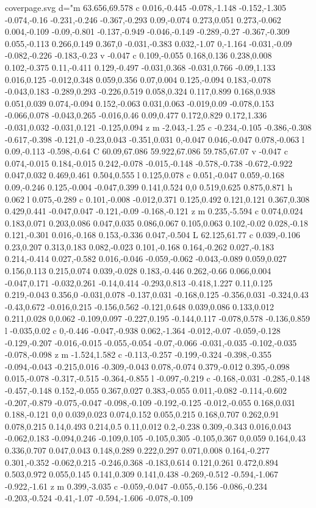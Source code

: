 \begin{filecontents}[noheader]{coverpage.svg}
					 d="m 63.656,69.578 c 0.016,-0.445 -0.078,-1.148 -0.152,-1.305 -0.074,-0.16 -0.231,-0.246 -0.367,-0.293 0.09,-0.074 0.273,0.051 0.273,-0.062 0.004,-0.109 -0.09,-0.801 -0.137,-0.949 -0.046,-0.149 -0.289,-0.27 -0.367,-0.309 0.055,-0.113 0.266,0.149 0.367,0 -0.031,-0.383 0.032,-1.07 0,-1.164 -0.031,-0.09 -0.082,-0.226 -0.183,-0.23 v -0.047 c 0.109,-0.055 0.168,0.136 0.238,0.008 0.102,-0.375 0.11,-0.411 0.129,-0.497 -0.031,0.368 -0.031,0.766 -0.09,1.133 0.016,0.125 -0.012,0.348 0.059,0.356 0.07,0.004 0.125,-0.094 0.183,-0.078 -0.043,0.183 -0.289,0.293 -0.226,0.519 0.058,0.324 0.117,0.899 0.168,0.938 0.051,0.039 0.074,-0.094 0.152,-0.063 0.031,0.063 -0.019,0.09 -0.078,0.153 -0.066,0.078 -0.043,0.265 -0.016,0.46 0.09,0.477 0.172,0.829 0.172,1.336 -0.031,0.032 -0.031,0.121 -0.125,0.094 z m -2.043,-1.25 c -0.234,-0.105 -0.386,-0.308 -0.617,-0.398 -0.121,0 -0.23,0.043 -0.351,0.031 0,-0.047 0.046,-0.047 0.078,-0.063 l 0.09,-0.113 -0.598,-0.64 C 60.09,67.086 59.922,67.086 59.785,67.07 v -0.047 c 0.074,-0.015 0.184,-0.015 0.242,-0.078 -0.015,-0.148 -0.578,-0.738 -0.672,-0.922 0.047,0.032 0.469,0.461 0.504,0.555 l 0.125,0.078 c 0.051,-0.047 0.059,-0.168 0.09,-0.246 0.125,-0.004 -0.047,0.399 0.141,0.524 0,0 0.519,0.625 0.875,0.871 h 0.062 l 0.075,-0.289 c 0.101,-0.008 -0.012,0.371 0.125,0.492 0.121,0.121 0.367,0.308 0.429,0.441 -0.047,0.047 -0.121,-0.09 -0.168,-0.121 z m 0.235,-5.594 c 0.074,0.024 0.183,0.071 0.203,0.086 0.047,0.035 0.086,0.067 0.105,0.063 0.102,-0.02 0.028,-0.18 0.121,-0.301 0.016,-0.168 0.153,-0.336 0.047,-0.504 L 62.125,61.77 c 0.039,-0.106 0.23,0.207 0.313,0.183 0.082,-0.023 0.101,-0.168 0.164,-0.262 0.027,-0.183 0.214,-0.414 0.027,-0.582 0.016,-0.046 -0.059,-0.062 -0.043,-0.089 0.059,0.027 0.156,0.113 0.215,0.074 0.039,-0.028 0.183,-0.446 0.262,-0.66 0.066,0.004 -0.047,0.171 -0.032,0.261 -0.14,0.414 -0.293,0.813 -0.418,1.227 0.11,0.125 0.219,-0.043 0.356,0 -0.031,0.078 -0.137,0.031 -0.168,0.125 -0.356,0.031 -0.324,0.43 -0.43,0.672 -0.016,0.215 -0.156,0.562 -0.121,0.648 0.039,0.086 0.133,0.012 0.211,0.028 0,0.062 -0.109,0.097 -0.227,0.195 -0.144,0.117 -0.078,0.578 -0.136,0.859 l -0.035,0.02 c 0,-0.446 -0.047,-0.938 0.062,-1.364 -0.012,-0.07 -0.059,-0.128 -0.129,-0.207 -0.016,-0.015 -0.055,-0.054 -0.07,-0.066 -0.031,-0.035 -0.102,-0.035 -0.078,-0.098 z m -1.524,1.582 c -0.113,-0.257 -0.199,-0.324 -0.398,-0.355 -0.094,-0.043 -0.215,0.016 -0.309,-0.043 0.078,-0.074 0.379,-0.012 0.395,-0.098 0.015,-0.078 -0.317,-0.515 -0.364,-0.855 l -0.097,-0.219 c -0.168,-0.031 -0.285,-0.148 -0.457,-0.148 0.152,-0.055 0.367,0.027 0.383,-0.055 0.011,-0.082 -0.114,-0.602 -0.207,-0.879 -0.075,-0.047 -0.098,-0.109 -0.192,-0.125 -0.012,-0.055 0.168,0.031 0.188,-0.121 0,0 0.039,0.023 0.074,0.152 0.055,0.215 0.168,0.707 0.262,0.91 0.078,0.215 0.14,0.493 0.214,0.5 0.11,0.012 0.2,-0.238 0.309,-0.343 0.016,0.043 -0.062,0.183 -0.094,0.246 -0.109,0.105 -0.105,0.305 -0.105,0.367 0,0.059 0.164,0.43 0.336,0.707 0.047,0.043 0.148,0.289 0.222,0.297 0.071,0.008 0.164,-0.277 0.301,-0.352 -0.062,0.215 -0.246,0.368 -0.183,0.614 0.121,0.261 0.472,0.894 0.503,0.972 0.055,0.145 0.141,0.309 0.141,0.438 -0.269,-0.512 -0.594,-1.067 -0.922,-1.61 z m 0.399,-3.035 c -0.059,-0.047 -0.055,-0.156 -0.086,-0.234 -0.203,-0.524 -0.41,-1.07 -0.594,-1.606 -0.078,-0.109 
\end{filecontents}
